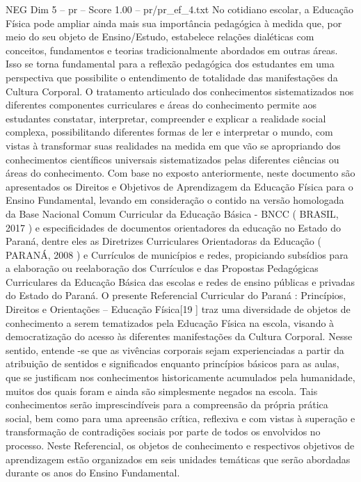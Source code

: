 \begin{textsample}{NEG Dim 5 – pr – Score 1.00 – pr/pr\_ef\_4.txt}
No cotidiano escolar, a Educação Física pode ampliar ainda mais sua importância pedagógica à medida que, por meio do seu objeto de Ensino/Estudo, estabelece relações dialéticas com conceitos, fundamentos e teorias tradicionalmente abordados em outras áreas.
Isso se torna fundamental para a reflexão pedagógica dos estudantes em uma perspectiva que possibilite o entendimento de totalidade das manifestações da Cultura Corporal.
O tratamento articulado dos conhecimentos sistematizados nos diferentes componentes curriculares e áreas do conhecimento permite aos estudantes constatar, interpretar, compreender e explicar a realidade social complexa, possibilitando diferentes formas de ler e interpretar o mundo, com vistas à transformar suas realidades na medida em que vão se apropriando dos conhecimentos científicos universais sistematizados pelas diferentes ciências ou áreas do conhecimento.
Com base no exposto anteriormente, neste documento são apresentados os Direitos e Objetivos de Aprendizagem da Educação Física para o Ensino Fundamental, levando em consideração o contido na versão homologada da Base Nacional Comum Curricular da Educação Básica - BNCC ( BRASIL, 2017 ) e especificidades de documentos orientadores da educação no Estado do Paraná, dentre eles as Diretrizes Curriculares Orientadoras da Educação ( PARANÁ, 2008 ) e Currículos de municípios e redes, propiciando subsídios para a elaboração ou reelaboração dos Currículos e das Propostas Pedagógicas Curriculares da Educação Básica das escolas e redes de ensino públicas e privadas do Estado do Paraná.
O presente Referencial Curricular do Paraná : Princípios, Direitos e Orientações – Educação Física[19 ] traz uma diversidade de objetos de conhecimento a serem tematizados pela Educação Física na escola, visando à democratização do acesso às diferentes manifestações da Cultura Corporal.
Nesse sentido, entende -se que as vivências corporais sejam experienciadas a partir da atribuição de sentidos e significados enquanto princípios básicos para as aulas, que se justificam nos conhecimentos historicamente acumulados pela humanidade, muitos dos quais foram e ainda são simplesmente negados na escola.
Tais conhecimentos serão imprescindíveis para a compreensão da própria prática social, bem como para uma apreensão crítica, reflexiva e com vistas à superação e transformação de contradições sociais por parte de todos os envolvidos no processo.
Neste Referencial, os objetos de conhecimento e respectivos objetivos de aprendizagem estão organizados em seis unidades temáticas que serão abordadas durante os anos do Ensino Fundamental.

\end{textsample}
